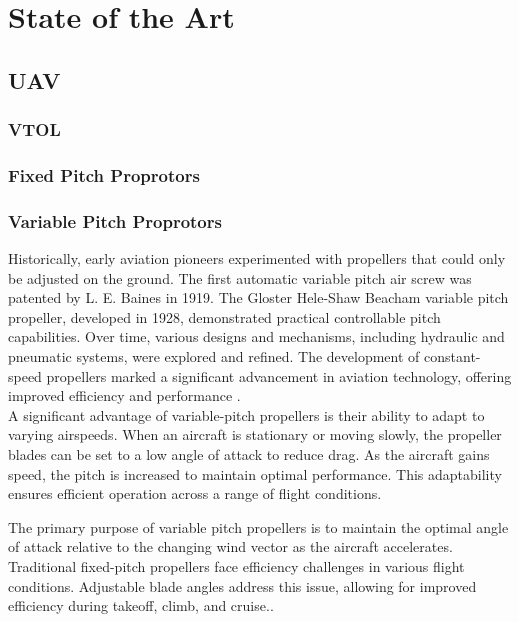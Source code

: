 \chapter{State of the Art} 
\label{chap:Chapter2}
\section{UAV}
\subsection{VTOL}
\subsection{Fixed Pitch Proprotors}
\subsection{Variable Pitch Proprotors}
Historically, early aviation pioneers experimented with propellers that could only be adjusted on the ground.
The first automatic variable pitch air screw was patented by L. E. Baines in 1919.
The Gloster Hele-Shaw Beacham variable pitch propeller, developed in 1928, demonstrated practical controllable pitch capabilities.
Over time, various designs and mechanisms, including hydraulic and pneumatic systems, were explored and refined.
The development of constant-speed propellers marked a significant advancement in aviation technology, offering improved efficiency and performance \cite{VPP2}.\\

A significant advantage of variable-pitch propellers is their ability to adapt to varying airspeeds. 
When an aircraft is stationary or moving slowly, the propeller blades can be set to a low angle of attack to reduce drag. As the aircraft gains speed, the pitch is increased to maintain optimal performance. 
This adaptability ensures efficient operation across a range of flight conditions.

The primary purpose of variable pitch propellers is to maintain the optimal angle of attack relative to the changing wind vector as the aircraft accelerates.
Traditional fixed-pitch propellers face efficiency challenges in various flight conditions.
Adjustable blade angles address this issue, allowing for improved efficiency during takeoff, climb, and cruise.\cite{VPP3}.\\

